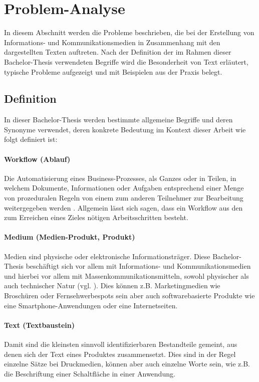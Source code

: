 \section{Problem-Analyse}

In diesem Abschnitt werden die Probleme beschrieben, die bei der Erstellung von Informations- und Kommunikationsmedien in Zusammenhang mit den dargestellten Texten auftreten. Nach der Definition der im Rahmen dieser Bachelor-Thesis verwendeten Begriffe wird die Besonderheit von Text erläutert,  typische Probleme aufgezeigt und mit Beispielen aus der Praxis belegt.

\subsection{Definition}
\label{l:def}

In dieser Bachelor-Thesis werden bestimmte allgemeine Begriffe und deren Synonyme verwendet, deren konkrete Bedeutung im Kontext dieser Arbeit wie folgt definiert ist:

\paragraph{Workflow (Ablauf)} Die Automatisierung eines Business-Prozesses, als Ganzes oder in Teilen, in welchem Dokumente, Informationen oder Aufgaben entsprechend einer Menge von prozeduralen Regeln von einem zum anderen Teilnehmer zur Bearbeitung weitergegeben werden \cite[S.8]{wmc}. Allgemein lässt sich sagen, dass ein Workflow aus den zum Erreichen eines Zieles nötigen Arbeitsschritten besteht.

\paragraph{Medium (Medien-Produkt, Produkt)} Medien sind physische oder elektronische Informationsträger. Diese Bachelor-Thesis beschäftigt sich vor allem mit Informations- und Kommunikationsmedien und hierbei vor allem mit Massenkommunikationsmitteln, sowohl physischer als auch technischer Natur (vgl. \cite[S.199–201]{schanze2002metzler}). Dies können z.B. Marketingmedien wie Broschüren oder Fernsehwerbespots sein aber auch softwarebasierte Produkte wie eine Smartphone-Anwendungen oder eine Internetseiten. 

\paragraph{Text (Textbaustein)} Damit sind die kleinsten sinnvoll identifizierbaren Bestandteile gemeint, aus denen sich der Text eines Produktes zusammensetzt. Dies sind in der Regel einzelne Sätze bei Druckmedien, können aber auch einzelne Worte sein, wie z.B. die Beschriftung einer Schaltfläche in einer Anwendung.

